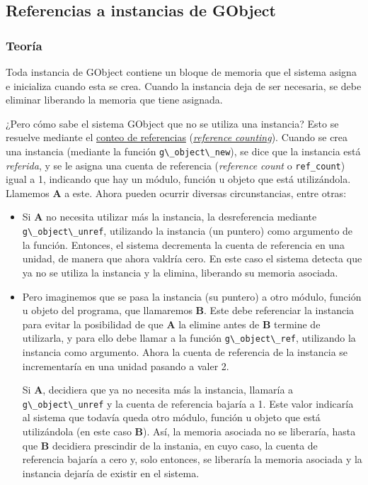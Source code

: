 \subsection{Referencias a instancias de \textsf{GObject}} \label{subsec:ref_instancias_gobject}
\subsubsection{Teoría}
Toda instancia de \textsf{GObject} contiene un bloque de memoria que el sistema asigna e inicializa cuando
esta se crea.
Cuando la instancia deja de ser necesaria, se debe eliminar liberando la memoria que tiene asignada.

¿Pero cómo sabe el sistema \textsf{GObject}  que no se utiliza una instancia?
Esto se resuelve mediante el
\href{https://es.wikipedia.org/wiki/Conteo_de_referencias}{conteo de referencias}
(\href{https://en.wikipedia.org/wiki/Reference_counting}{\textit{reference counting}}).
Cuando se crea una instancia (mediante la función \passthrough{\lstinline!g\_object\_new!}), se dice que
la instancia está \emph{referida}, y se le asigna una cuenta de referencia (\textit{reference count} o \texttt{ref\_count}) igual a 1, indicando que hay un módulo, función
u objeto que está utilizándola. Llamemos \textbf{A} a este.
Ahora pueden ocurrir diversas circunstancias, entre otras:
\begin{itemize}
  \tightlist
\item Si \textbf{A} no necesita utilizar más la instancia, la desreferencia mediante \passthrough{\lstinline!g\_object\_unref!}, utilizando la instancia (un puntero) como argumento de la función.
  Entonces, el sistema decrementa la cuenta de referencia en una unidad, de manera que ahora valdría cero.
  En este caso el sistema detecta que ya no se utiliza la instancia y la elimina, liberando su memoria asociada.
  \item Pero imaginemos que se pasa la instancia (su puntero) a otro módulo, función u objeto del programa,
    que llamaremos \textbf{B}. Este debe referenciar la instancia para evitar la posibilidad de que \textbf{A} la
    elimine antes de \textbf{B} termine de utilizarla, y para ello debe llamar a la función
    \passthrough{\lstinline!g\_object\_ref!}, utilizando la instancia como argumento.
    Ahora la cuenta de referencia de la instancia se incrementaría en una unidad pasando a valer 2.

    Si \textbf{A}, decidiera que ya no necesita más la instancia, llamaría a
    \passthrough{\lstinline!g\_object\_unref!} y la cuenta de referencia bajaría a 1. Este valor indicaría al sistema
    que todavía queda otro módulo, función u objeto que está utilizándola (en este caso \textbf{B}). Así,
    la memoria asociada no se liberaría, hasta que \textbf{B} decidiera prescindir de la instania, en cuyo caso,
    la cuenta de referencia bajaría a cero y, solo entonces, se liberaría la memoria asociada y la instancia dejaría de
    existir en el sistema.
  \end{itemize}

